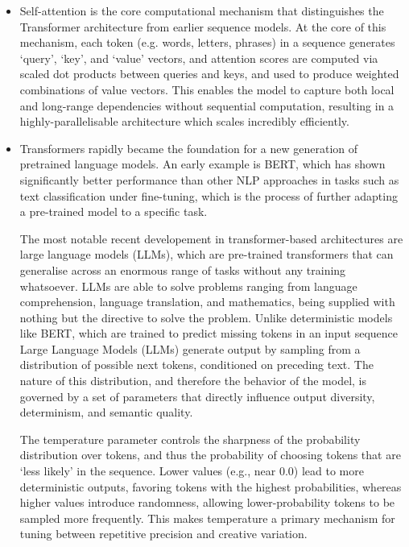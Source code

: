 \documentclass{report}
\begin{document}
\begin{itemize}
\item Self-attention is the core computational mechanism that distinguishes the Transformer architecture from earlier sequence models. At the core of this mechanism, each token (e.g. words, letters, phrases) in a sequence generates `query', `key', and `value' vectors, and attention scores are computed via scaled dot products between queries and keys, and used to produce weighted combinations of value vectors\cite{vaswani-2017-attention-is-all-you-need}. This enables the model to capture both local and long-range dependencies without sequential computation, resulting in a highly-parallelisable architecture which scales incredibly efficiently.

\item Transformers rapidly became the foundation for a new generation of pretrained language models. An early example is BERT, which has shown significantly better performance than other NLP approaches in tasks such as text classification under fine-tuning, which is the process of further adapting a pre-trained model to a specific task\cite{devlin-etal-2019-bert}.

The most notable recent developement in transformer-based architectures are large language models (LLMs), which are pre-trained transformers that can generalise across an enormous range of tasks without any training whatsoever\cite{NEURIPS2020_1457c0d6}. LLMs are able to solve problems ranging from language comprehension, language translation, and mathematics, being supplied with nothing but the directive to solve the problem. Unlike deterministic models like BERT, which are trained to predict missing tokens in an input sequence Large Language Models (LLMs) generate output by sampling from a distribution of possible next tokens, conditioned on preceding text\cite{vaswani-2017-attention-is-all-you-need}. The nature of this distribution, and therefore the behavior of the model, is governed by a set of parameters that directly influence output diversity, determinism, and semantic quality.

The temperature parameter controls the sharpness of the probability distribution over tokens, and thus the probability of choosing tokens that are `less likely' in the sequence\cite{holtzman2019curious}. Lower values (e.g., near 0.0) lead to more deterministic outputs, favoring tokens with the highest probabilities, whereas higher values introduce randomness, allowing lower-probability tokens to be sampled more frequently. This makes temperature a primary mechanism for tuning between repetitive precision and creative variation.


\end{itemize}
\end{document}
